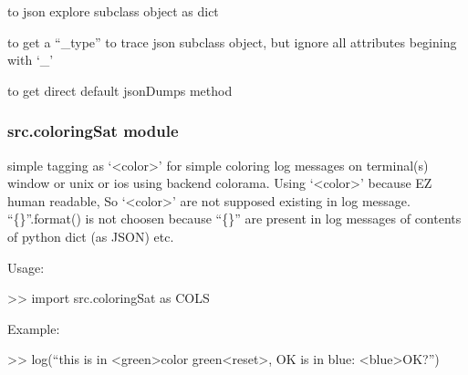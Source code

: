 \documentclass[a4paper,10pt,english]{sphinxmanual}
\begin{document}
\begin{fulllineitems}
\label{\detokenize{apidoc_src/src:src.catchAll.dumper}}
to json explore subclass object as dict

\end{fulllineitems}


\begin{fulllineitems}
\label{\detokenize{apidoc_src/src:src.catchAll.dumperType}}
to get a “\_type” to trace json subclass object,
but ignore all attributes begining with ‘\_’

\end{fulllineitems}


\begin{fulllineitems}
\label{\detokenize{apidoc_src/src:src.catchAll.jsonDumps}}
to get direct default jsonDumps method

\end{fulllineitems}



\subsubsection{src.coloringSat module}
\label{\detokenize{apidoc_src/src:module-src.coloringSat}}\label{\detokenize{apidoc_src/src:src-coloringsat-module}}
simple tagging as ‘\textless{}color\textgreater{}’ for simple coloring log messages on terminal(s)
window or unix or ios using backend colorama.
Using ‘\textless{}color\textgreater{}’ because EZ human readable,
So ‘\textless{}color\textgreater{}’ are not supposed existing in log message.
“\{\}”.format() is not choosen because “\{\}” are present
in log messages of contents of python dict (as JSON) etc.

\begin{DUlineblock}{0em}
\item[] Usage:
\item[] \textgreater{}\textgreater{} import src.coloringSat as COLS
\item[] 
\item[] Example:
\item[] \textgreater{}\textgreater{} log(“this is in \textless{}green\textgreater{}color green\textless{}reset\textgreater{}, OK is in blue: \textless{}blue\textgreater{}OK?”)
\end{DUlineblock}
\end{document}
